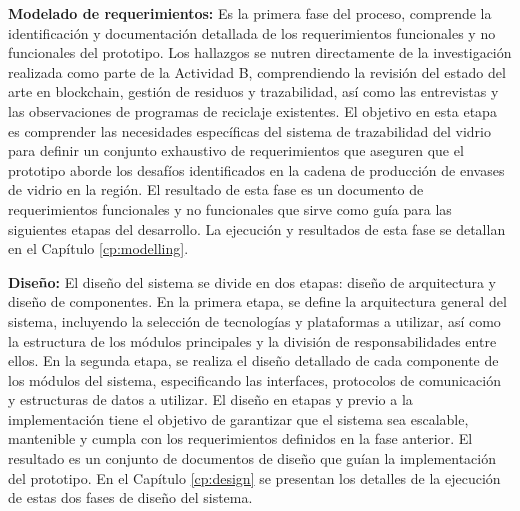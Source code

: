\textbf{Modelado de requerimientos:}
Es la primera fase del proceso, comprende la identificación y documentación detallada de los requerimientos funcionales y no funcionales del prototipo.
Los hallazgos se nutren directamente de la investigación realizada como parte de la Actividad B, comprendiendo la revisión del estado del arte en blockchain, gestión de residuos y trazabilidad, así como las entrevistas y las observaciones de programas de reciclaje existentes.
El objetivo en esta etapa es comprender las necesidades específicas del sistema de trazabilidad del vidrio para definir un conjunto exhaustivo de requerimientos que aseguren que el prototipo aborde los desafíos identificados en la cadena de producción de envases de vidrio en la región.
El resultado de esta fase es un documento de requerimientos funcionales y no funcionales que sirve como guía para las siguientes etapas del desarrollo.
La ejecución y resultados de esta fase se detallan en el Capítulo \ref{cp:modelling}.

\textbf{Diseño:}
El diseño del sistema se divide en dos etapas: diseño de arquitectura y diseño de componentes.
En la primera etapa, se define la arquitectura general del sistema, incluyendo la selección de tecnologías y plataformas a utilizar, así como la estructura de los módulos principales y la división de responsabilidades entre ellos.
En la segunda etapa, se realiza el diseño detallado de cada componente de los módulos del sistema, especificando las interfaces, protocolos de comunicación y estructuras de datos a utilizar.
El diseño en etapas y previo a la implementación tiene el objetivo de garantizar que el sistema sea escalable, mantenible y cumpla con los requerimientos definidos en la fase anterior.
El resultado es un conjunto de documentos de diseño que guían la implementación del prototipo. En el Capítulo \ref{cp:design} se presentan los detalles de la ejecución de estas dos fases de diseño del sistema.

